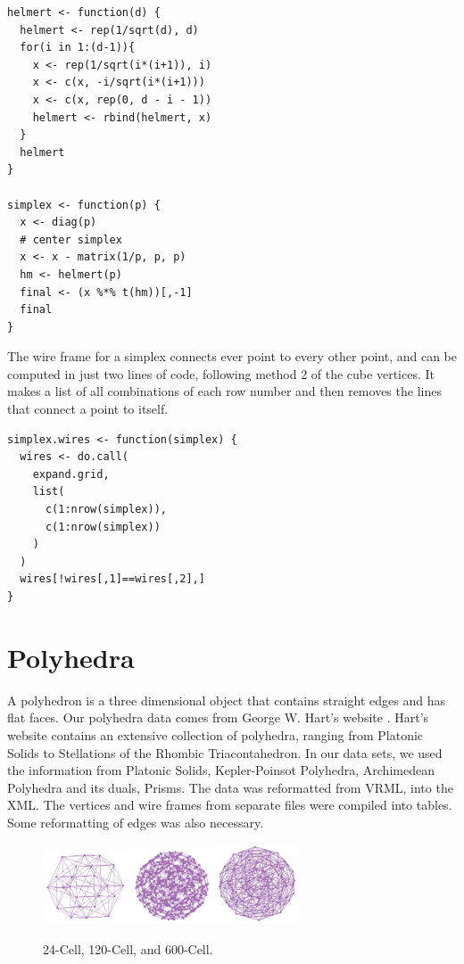 \documentclass[a4paper]{report}
\begin{document}
\begin{article}
\begin{verbatim}
helmert <- function(d) {
  helmert <- rep(1/sqrt(d), d)
  for(i in 1:(d-1)){
    x <- rep(1/sqrt(i*(i+1)), i)
    x <- c(x, -i/sqrt(i*(i+1)))
    x <- c(x, rep(0, d - i - 1))
    helmert <- rbind(helmert, x)
  }
  helmert
}

simplex <- function(p) {
  x <- diag(p)
  # center simplex
  x <- x - matrix(1/p, p, p) 
  hm <- helmert(p) 
  final <- (x %*% t(hm))[,-1]
  final
}
\end{verbatim}

The wire frame for a simplex connects ever point to every other point, and can
be computed in just two lines of code, following method 2 of the cube
vertices. It makes a list of all combinations of each row number and then
removes the lines that connect a point to itself.

\begin{verbatim}
simplex.wires <- function(simplex) {
  wires <- do.call(
    expand.grid, 
    list(
      c(1:nrow(simplex)),
      c(1:nrow(simplex))
    )
  )
  wires[!wires[,1]==wires[,2],]
}
\end{verbatim}

\section{Polyhedra}

A polyhedron is a three dimensional object that contains straight
edges and has flat faces. Our polyhedra data comes from George
W. Hart's website \citep{GeorgeVP}. Hart's website contains an
extensive collection of polyhedra, ranging from Platonic Solids to
Stellations of the Rhombic Triacontahedron. In our data sets, we used
the information from Platonic Solids, Kepler-Poinsot Polyhedra,
Archimedean Polyhedra and its duals, Prisms. The data was reformatted
from VRML, into the XML. The vertices and wire frames from separate
files were compiled into tables. Some reformatting of edges was also
necessary.

\begin{figure}[ht]
\centerline{
\includegraphics[width=1.0in]{24-cell.pdf}\includegraphics[width=1in]{120-cell.pdf}\includegraphics[width=1in]{600-cell.pdf}}
\caption{24-Cell, 120-Cell, and 600-Cell.}
\end{figure}


\end{article}
\end{document}
